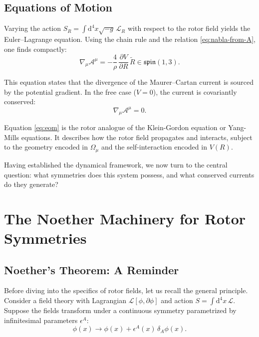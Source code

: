 \documentclass[11pt,a4paper]{article}
\numberwithin{equation}{section}
\theoremstyle{plain}
\theoremstyle{definition}
\theoremstyle{remark}
\newcommand{\dd}{\mathrm{d}}
\begin{document}
\subsection{Equations of Motion}

Varying the action $S_R = \int \dd^4x \sqrt{-g}\, \mathcal{L}_R$ with respect to the rotor field yields the Euler--Lagrange equation. Using the chain rule and the relation \eqref{eq:nabla-from-A}, one finds compactly:
\begin{equation}
\nabla_\mu \mathcal{A}^\mu = -\frac{4}{\rho}\,\frac{\partial V}{\partial R}\,\widetilde{R} \in \mathfrak{spin}(1,3).
\label{eq:eom}
\end{equation}

This equation states that the divergence of the Maurer--Cartan current is sourced by the potential gradient. In the free case ($V=0$), the current is covariantly conserved:
\begin{equation}
\nabla_\mu \mathcal{A}^\mu = 0.
\end{equation}

Equation \eqref{eq:eom} is the rotor analogue of the Klein-Gordon equation or Yang-Mills equations. It describes how the rotor field propagates and interacts, subject to the geometry encoded in $\Omega_\mu$ and the self-interaction encoded in $V(R)$.

Having established the dynamical framework, we now turn to the central question: what symmetries does this system possess, and what conserved currents do they generate?

\section{The Noether Machinery for Rotor Symmetries}
\label{sec:noether}

\subsection{Noether's Theorem: A Reminder}

Before diving into the specifics of rotor fields, let us recall the general principle. Consider a field theory with Lagrangian $\mathcal{L}[\phi, \partial\phi]$ and action $S = \int \dd^4x\, \mathcal{L}$. Suppose the fields transform under a continuous symmetry parametrized by infinitesimal parameters $\epsilon^A$:
\begin{equation}
\phi(x) \to \phi(x) + \epsilon^A(x)\, \delta_A \phi(x).
\end{equation}
\end{document}
